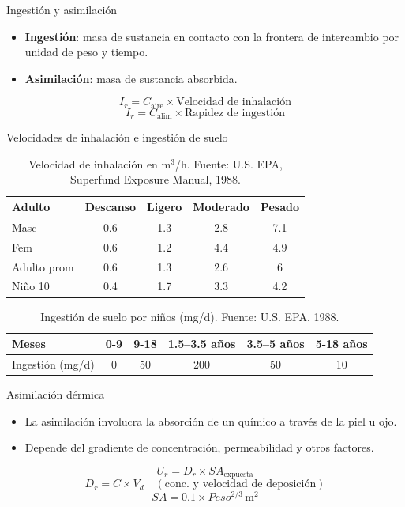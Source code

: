 \documentclass[10pt,compress]{beamer}
\begin{document}
\begin{frame}{Ingestión y asimilación}
\begin{itemize}
\item \textbf{Ingestión}: masa de sustancia en contacto con la frontera de intercambio por unidad de peso y tiempo.
\item \textbf{Asimilación}: masa de sustancia absorbida.
\end{itemize}
\[
I_r = C_{\text{aire}} \times \text{Velocidad de inhalación}
\]
\[
I_r = C_{\text{alim}} \times \text{Rapidez de ingestión}
\]
\end{frame}

\begin{frame}{Velocidades de inhalación e ingestión de suelo}
\begin{table}
\centering
\begin{tabular}{lcccc}
\toprule
\textbf{Adulto} & Descanso & Ligero & Moderado & Pesado \\
\midrule
Masc & 0.6 & 1.3 & 2.8 & 7.1 \\
Fem & 0.6 & 1.2 & 4.4 & 4.9 \\
Adulto prom & 0.6 & 1.3 & 2.6 & 6 \\
Niño 10 & 0.4 & 1.7 & 3.3 & 4.2 \\
\bottomrule
\end{tabular}
\caption{Velocidad de inhalación en m$^3$/h. Fuente: U.S. EPA, Superfund Exposure Manual, 1988.}
\end{table}
\begin{table}
\centering
\begin{tabular}{lccccc}
\toprule
\textbf{Meses} & 0-9 & 9-18 & 1.5--3.5 años & 3.5--5 años & 5-18 años \\
\midrule
Ingestión (mg/d) & 0 & 50 & 200 & 50 & 10 \\
\bottomrule
\end{tabular}
\caption{Ingestión de suelo por niños (mg/d). Fuente: U.S. EPA, 1988.}
\end{table}
\end{frame}

\begin{frame}{Asimilación dérmica}
\begin{itemize}
\item La asimilación involucra la absorción de un químico a través de la piel u ojo.
\item Depende del gradiente de concentración, permeabilidad y otros factores.
\end{itemize}
\[
U_r = D_r \times SA_{\text{expuesta}}
\]
\[
D_r = C \times V_d \quad (\text{conc. y velocidad de deposición})
\]
\[
SA = 0.1 \times Peso^{2/3} \, \text{m}^2
\]
\end{frame}
\end{document}
